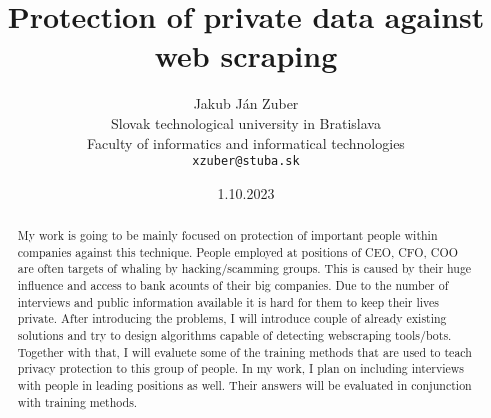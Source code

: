\documentclass[10pt,oneside,english,a4paper]{article}
\title{Protection of private data against web scraping} %
\author{Jakub Ján Zuber\\[2pt]
	{\small Slovak technological university in Bratislava}\\
	{\small Faculty of informatics and informatical technologies}\\
	{\small \texttt{xzuber@stuba.sk}}
	}
\date{\small 1.10.2023} %
\begin{document}
\maketitle

\begin{abstract}

My work is going to be mainly focused on protection of important people within companies against this technique. People employed at positions of CEO, CFO, COO are often targets of whaling by hacking/scamming groups. This is caused by their huge influence and access to bank acounts of their big companies. Due to the number of interviews and public information available it is hard for them to keep their lives private. After introducing the problems, I will introduce couple of already existing solutions and try to design algorithms capable of detecting webscraping tools/bots. Together with that, I will evaluete some of the training methods that are used to teach privacy protection to this group of people. In my work, I plan on including interviews with people in leading positions as well. Their answers will be evaluated in conjunction with training methods.

\end{abstract}




\end{document}
